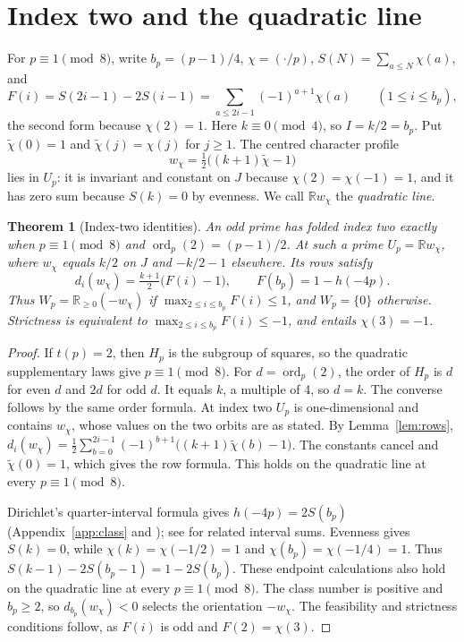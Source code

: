 \documentclass[11pt,reqno]{amsart}
\newtheorem{theorem}{Theorem}
\newcommand{\R}{\mathbb R}
\newcommand{\ord}{\operatorname{ord}}
\begin{document}
\section{Index two and the quadratic line}
For \(p\equiv1\pmod8\), write \(b_p=(p-1)/4\), \(\chi=(\cdot/p)\), \(S(N)=\sum_{a\le N}\chi(a)\), and
\[
 F(i)=S(2i-1)-2S(i-1)=\sum_{a\le 2i-1}(-1)^{a+1}\chi(a)\qquad(1\le i\le b_p),
\]
the second form because \(\chi(2)=1\). Here \(k\equiv0\pmod4\), so \(I=k/2=b_p\). Put \(\tilde\chi(0)=1\) and \(\tilde\chi(j)=\chi(j)\) for \(j\ge1\). The centred character profile
\[
 w_\chi=\tfrac12\big((k+1)\tilde\chi-1\big)
\]
lies in \(U_p\): it is invariant and constant on \(J\) because \(\chi(2)=\chi(-1)=1\), and it has zero sum because \(S(k)=0\) by evenness. We call \(\R w_\chi\) the \emph{quadratic line}.

\begin{theorem}[Index-two identities]\label{th:quadratic}
An odd prime has folded index two exactly when \(p\equiv1\pmod8\) and \(\ord_p(2)=(p-1)/2\). At such a prime \(U_p=\R w_\chi\), where \(w_\chi\) equals \(k/2\) on \(J\) and \(-k/2-1\) elsewhere. Its rows satisfy
\[
 d_i(w_\chi)=\tfrac{k+1}{2}\big(F(i)-1\big),\qquad
 F(b_p)=1-h(-4p).
\]
Thus \(W_p=\R_{\ge0}(-w_\chi)\) if \(\max_{2\le i\le b_p}F(i)\le1\), and \(W_p=\{0\}\) otherwise. Strictness is equivalent to \(\max_{2\le i\le b_p}F(i)\le-1\), and entails \(\chi(3)=-1\).
\end{theorem}
\begin{proof}
If \(t(p)=2\), then \(H_p\) is the subgroup of squares, so the quadratic supplementary laws give \(p\equiv1\pmod8\). For \(d=\ord_p(2)\), the order of \(H_p\) is \(d\) for even \(d\) and \(2d\) for odd \(d\). It equals \(k\), a multiple of 4, so \(d=k\). The converse follows by the same order formula. At index two \(U_p\) is one-dimensional and contains \(w_\chi\), whose values on the two orbits are as stated. By Lemma~\ref{lem:rows}, \(d_i(w_\chi)=\frac12\sum_{b=0}^{2i-1}(-1)^{b+1}\big((k+1)\tilde\chi(b)-1\big)\). The constants cancel and \(\tilde\chi(0)=1\), which gives the row formula. This holds on the quadratic line at every \(p\equiv1\pmod8\).

Dirichlet's quarter-interval formula gives \(h(-4p)=2S(b_p)\) (Appendix~\ref{app:class} and \cite[(5)]{WC}); see \cite{Berndt,JM} for related interval sums. Evenness gives \(S(k)=0\), while \(\chi(k)=\chi(-1/2)=1\) and \(\chi(b_p)=\chi(-1/4)=1\). Thus \(S(k-1)-2S(b_p-1)=1-2S(b_p)\). These endpoint calculations also hold on the quadratic line at every \(p\equiv1\pmod8\). The class number is positive and \(b_p\ge2\), so \(d_{b_p}(w_\chi)<0\) selects the orientation \(-w_\chi\). The feasibility and strictness conditions follow, as \(F(i)\) is odd and \(F(2)=\chi(3)\).
\end{proof}
\end{document}

